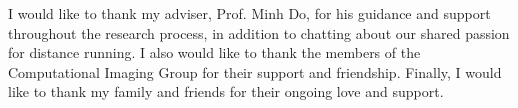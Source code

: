 I would like to thank my adviser, Prof. Minh Do, for his guidance and support
throughout the research process, in addition to chatting about our shared
passion for distance running. I also would like to thank the members of the
Computational Imaging Group for their support and friendship. Finally, I would
like to thank my family and friends for their ongoing love and support.
